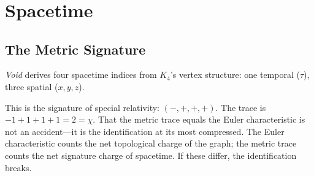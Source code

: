 \documentclass[11pt,a4paper]{book}
\newcommand{\VoidRef}[2]{\textit{#2} (in \textit{Void})}
\begin{document}
\begin{code}
\\
%
\>[2]\AgdaSpace{}%
\AgdaSymbol{:}\<%
\\
\>[2][@{}l@{\AgdaIndent{0}}]%
\>[4]\AgdaSpace{}%
\AgdaSpace{}%
\AgdaSymbol{((}\AgdaSpace{}%
\AgdaSymbol{(}\AgdaSpace{}%
\AgdaSpace{}%
\AgdaSymbol{))}\AgdaSpace{}%
\AgdaOperator{\AgdaInductiveConstructor{/}}\AgdaSpace{}%
\AgdaSymbol{(}\AgdaSpace{}%
\AgdaSymbol{(}\AgdaSpace{}%
\AgdaOperator{\AgdaPrimitive{+}}\AgdaSpace{}%
\AgdaSpace{}%
\AgdaSpace{}%
\AgdaSymbol{)))}\<%
\\
%
\>[2]\AgdaSpace{}%
\AgdaSymbol{=}\AgdaSpace{}%
\<%
\end{code}

\part{Spacetime}

\chapter{The Metric Signature}
\label{ch:metric-signature}

\textit{Void} derives four spacetime indices from $K_4$'s vertex structure: one temporal ($\tau$), three spatial ($x, y, z$).%

This is the signature of special relativity: $(-,+,+,+)$. The trace is $-1 + 1 + 1 + 1 = 2 = \chi$. That the metric trace equals the Euler characteristic is not an accident---it is the identification at its most compressed. The Euler characteristic counts the net topological charge of the graph; the metric trace counts the net signature charge of spacetime. If these differ, the identification breaks.
\end{document}

